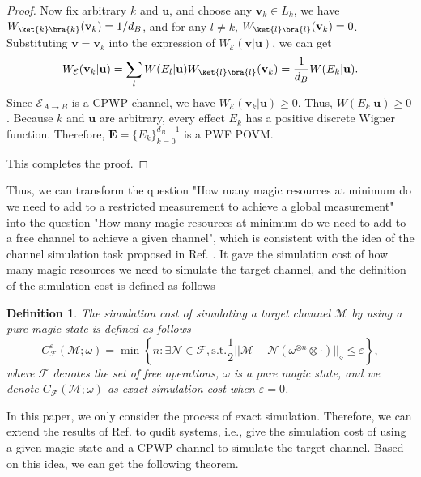 \documentclass[aps,pra,twocolumn,floatfix,amsfonts,10pt]{revtex4-2}
\newtheorem{definition}{Definition}
\begin{document}
\begin{proof}
	Now fix arbitrary $k$ and $\mathbf{u}$, and choose any $\mathbf{v}_k\in L_k$, we have $W_{\ket{k}\bra{k}}(\mathbf{v}_k)=1/d_B$, and for any $l\neq k$, $W_{\ket{l}\bra{l}}(\mathbf{v}_k)=0$.
	Substituting $\mathbf{v}=\mathbf{v}_k$ into the expression of $W_{\mathcal{E}}(\mathbf{v}|\mathbf{u})$, we can get
	\begin{equation}\label{Lagrange affine}
			W_{\mathcal{E}}(\mathbf{v}_k|\mathbf{u}) = \sum_{l}W(E_l|\mathbf{u})W_{\ket{l}\bra{l}}(\mathbf{v}_k) = \frac{1}{d_B}W(E_k|\mathbf{u}).
	\end{equation}
	Since $\mathcal{E}_{A \rightarrow B}$ is a CPWP channel, we have $W_{\mathcal{E}}(\mathbf{v}_k|\mathbf{u})\geqslant 0$.
	Thus, $W(E_k|\mathbf{u})\geqslant 0$.
	Because $k$ and $\mathbf{u}$ are arbitrary, every effect $E_k$ has a positive discrete Wigner function.
	Therefore, $\mathbf{E}=\{E_k\}_{k=0}^{d_B-1}$ is a PWF POVM.
	
	This completes the proof.
\end{proof}
Thus, we can transform the question "How many magic resources at minimum do we need to add to a restricted measurement to achieve a global measurement" into the question "How many magic resources at minimum do we need to add to a free channel to achieve a given channel", which is consistent with the idea of the channel simulation task proposed in Ref. \cite{WL2026}. 
It gave the simulation cost of how many magic resources we need to simulate the target channel, and the definition of the simulation cost is defined as follows
\begin{definition}
	The simulation cost of simulating a target channel $\mathcal{M}$ by using a pure magic state is defined as follows
	\begin{equation}
		C_{\mathcal{F}}^{\varepsilon}(\mathcal{M};\omega) = \min \left\{n: \exists \mathcal{N} \in \mathcal{F}, \mathrm{s.t.} \frac{1}{2} ||\mathcal{M}-\mathcal{N}(\omega^{\otimes n}\otimes \cdot)||_{\diamond}\leqslant \varepsilon\right\},
	\end{equation}
	where $\mathcal{F}$ denotes the set of free operations, $\omega$ is a pure magic state, and we denote $C_{\mathcal{F}}(\mathcal{M};\omega)$ as exact simulation cost when $\varepsilon=0$.
\end{definition}

In this paper, we only consider the process of exact simulation.
Therefore, we can extend the results of Ref. \cite{WL2026} to qudit systems, i.e., give the simulation cost of using a given magic state and a CPWP channel to simulate the target channel.
Based on this idea, we can get the following theorem.
\end{document}
